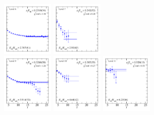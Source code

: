 \begin{figure}
  \includegraphics[width=0.22\textwidth]{figures/spectrum_a1gm/with_tq/fits/fit_6.pdf}
  \includegraphics[width=0.22\textwidth]{figures/spectrum_a1gm/with_tq/fits/fit_8.pdf}\\
  \includegraphics[width=0.22\textwidth]{figures/spectrum_a1gm/with_tq/fits/fit_9.pdf}
  \includegraphics[width=0.22\textwidth]{figures/spectrum_a1gm/with_tq/fits/fit_10.pdf}
  \includegraphics[width=0.22\textwidth]{figures/spectrum_a1gm/with_tq/fits/fit_11.pdf}\\

\end{figure}
